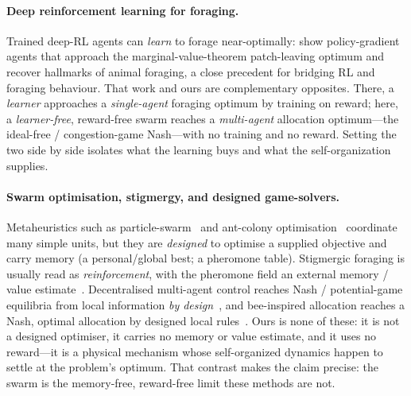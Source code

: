 \documentclass{article}
\begin{document}
\paragraph{Deep reinforcement learning for foraging.} Trained deep-RL agents can \emph{learn} to forage
near-optimally: \citet{wispinski2023foraging} show policy-gradient agents that approach the marginal-value-theorem
patch-leaving optimum and recover hallmarks of animal foraging, a close precedent for bridging RL and foraging
behaviour. That work and ours are complementary opposites. There, a \emph{learner} approaches a
\emph{single-agent} foraging optimum by training on reward; here, a \emph{learner-free}, reward-free swarm
reaches a \emph{multi-agent} allocation optimum---the ideal-free / congestion-game Nash---with no training and no
reward. Setting the two side by side isolates what the learning buys and what the self-organization supplies.

\paragraph{Swarm optimisation, stigmergy, and designed game-solvers.} Metaheuristics such as
particle-swarm~\citep{kennedy1995particle} and ant-colony optimisation~\citep{dorigo1996ant} coordinate many
simple units, but they are \emph{designed} to optimise a supplied objective and carry memory (a personal/global
best; a pheromone table). Stigmergic foraging is usually read as \emph{reinforcement}, with the pheromone field
an external memory / value estimate~\citep{vellinger2025pheromones}. Decentralised multi-agent control reaches
Nash / potential-game equilibria from local information \emph{by design}~\citep{marden2009cooperative}, and
bee-inspired allocation reaches a Nash, optimal allocation by designed local rules~\citep{quijano2010honeybee}.
Ours is none of these: it is not a designed optimiser, it carries no memory or value estimate, and it uses no
reward---it is a physical mechanism whose self-organized dynamics happen to settle at the problem's optimum.
That contrast makes the claim precise: the swarm is the memory-free, reward-free limit these methods are not.
\end{document}
